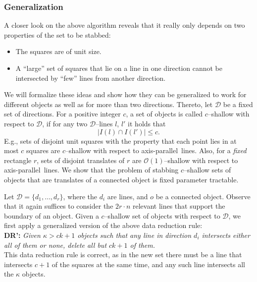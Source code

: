\documentclass[12pt]{article}
\newcommand{\ap}{a.p.\ }
\renewcommand{\ap}{axis-parallel\ }
\newcommand{\order}{\mathcal{O}}
\newcommand{\calD}{\mathcal{D}}
\begin{document}
 
\subsubsection{Generalization}\label{sssec:FPTGeneralized}

A closer look on the above algorithm reveals that it really only depends on two properties of the set to be stabbed:
\begin{itemize}
	\item The squares are of unit size.
	\item A ``large'' set of squares that lie on a line in one direction cannot be intersected by ``few'' lines from another direction.
\end{itemize}
We will formalize these ideas and show how they can be generalized to work for different objects as well as for more than two directions. Thereto, let $\calD$ be a fixed set of directions. For a positive integer $c$, a set of objects is called $c$--shallow with respect to $\calD$, if for any two $\calD$--lines $l$, $l'$ it holds that
\[ |I(l) \cap I(l')| \leq c. \]
E.g., sets of disjoint unit squares with the property that each point lies
in at most $c$ squares are $c$--shallow with respect to \ap lines. Also,
for a \emph{fixed} rectangle $r$, sets of disjoint translates of $r$ are
$\order(1)$--shallow with respect to \ap lines. 
We show that the problem of stabbing $c$--shallow sets of objects that are translates of a connected object is fixed parameter tractable.

Let $\calD = \{d_1, \dots, d_r\}$, where the $d_i$ are lines, and $o$ be a connected object. Observe that it again suffices to consider the $2r \cdot n$ relevant lines that support the boundary of an object.
Given a $c$--shallow set of objects with respect to $\calD$, we first apply a generalized version of the above data reduction rule:\\
\textbf{DR': } 
\emph{Given $\kappa > ck + 1$ objects such that any line in direction $d_i$ intersects either all of them or none, delete all but $ck + 1$ of them.}\\
This data reduction rule is correct, as in the new set there must be a line that intersects $c+1$ of the squares at the same time, and any such line intersects all the $\kappa$ objects.
\end{document}
